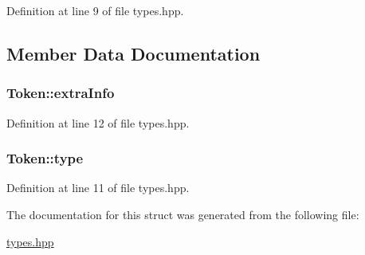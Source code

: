 Definition at line 9 of file types.\+hpp.



\subsection{Member Data Documentation}
\hypertarget{struct_token_a4f87d42e49694469c8a97080e4831370}{}
\subsubsection[{extra\+Info}]{ Token\+::extra\+Info}\label{struct_token_a4f87d42e49694469c8a97080e4831370}


Definition at line 12 of file types.\+hpp.

\hypertarget{struct_token_a67919af9f3a80dc0b28a0ab1e6d5bf8a}{}
\subsubsection[{type}]{ Token\+::type}\label{struct_token_a67919af9f3a80dc0b28a0ab1e6d5bf8a}


Definition at line 11 of file types.\+hpp.



The documentation for this struct was generated from the following file\+:\begin{DoxyCompactItemize}
\item 
\hyperlink{types_8hpp}{types.\+hpp}\end{DoxyCompactItemize}
